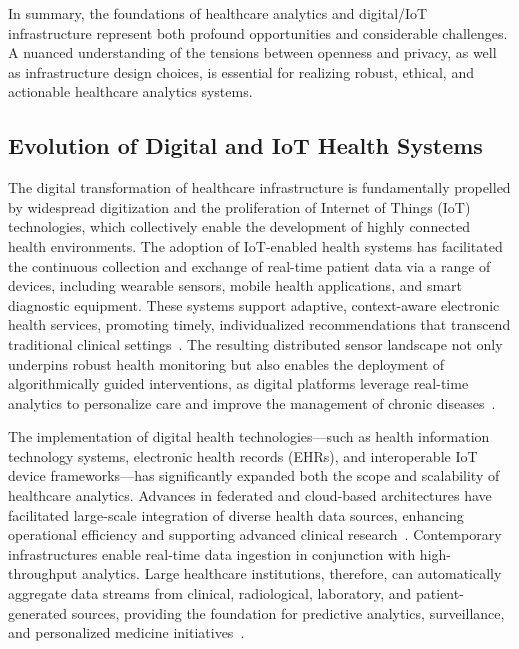 \documentclass[sigconf]{acmart}
\begin{document}
In summary, the foundations of healthcare analytics and digital/IoT infrastructure represent both profound opportunities and considerable challenges. A nuanced understanding of the tensions between openness and privacy, as well as infrastructure design choices, is essential for realizing robust, ethical, and actionable healthcare analytics systems.

\subsection{Evolution of Digital and IoT Health Systems}

The digital transformation of healthcare infrastructure is fundamentally propelled by widespread digitization and the proliferation of Internet of Things (IoT) technologies, which collectively enable the development of highly connected health environments. The adoption of IoT-enabled health systems has facilitated the continuous collection and exchange of real-time patient data via a range of devices, including wearable sensors, mobile health applications, and smart diagnostic equipment. These systems support adaptive, context-aware electronic health services, promoting timely, individualized recommendations that transcend traditional clinical settings~\cite{ref82,ref106}. The resulting distributed sensor landscape not only underpins robust health monitoring but also enables the deployment of algorithmically guided interventions, as digital platforms leverage real-time analytics to personalize care and improve the management of chronic diseases~\cite{ref106}.

The implementation of digital health technologies---such as health information technology systems, electronic health records (EHRs), and interoperable IoT device frameworks---has significantly expanded both the scope and scalability of healthcare analytics. Advances in federated and cloud-based architectures have facilitated large-scale integration of diverse health data sources, enhancing operational efficiency and supporting advanced clinical research~\cite{ref82,ref84,ref90,ref106}. Contemporary infrastructures enable real-time data ingestion in conjunction with high-throughput analytics. Large healthcare institutions, therefore, can automatically aggregate data streams from clinical, radiological, laboratory, and patient-generated sources, providing the foundation for predictive analytics, surveillance, and personalized medicine initiatives~\cite{ref106,ref84}.
\end{document}
